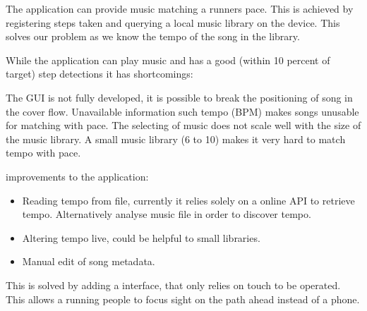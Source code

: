 The application can provide music matching a runners pace. This is achieved by registering steps taken and querying a local music library on the device. This solves our problem as we know the tempo of the song in the library.

While the application can play music and has a good (within 10 percent of target) step detections it has shortcomings: 

The GUI is not fully developed, it is possible to break the positioning of song in the cover flow. Unavailable information such tempo (BPM) makes songs unusable for matching with pace. The selecting of music does not scale well with the size of the music library. A small music library (6 to 10) makes it very hard to match tempo with pace. 

improvements to the application:
\begin{itemize}
\item Reading tempo from file, currently it relies solely on a online API to retrieve tempo.
\subitem Alternatively analyse music file in order to discover tempo.
\item Altering tempo live, could be helpful to small libraries.
\item Manual edit of song metadata. 
\end{itemize}



This is solved by adding a interface, that only relies on touch to be operated. This allows a running people to focus sight on the path ahead instead of a phone. 






